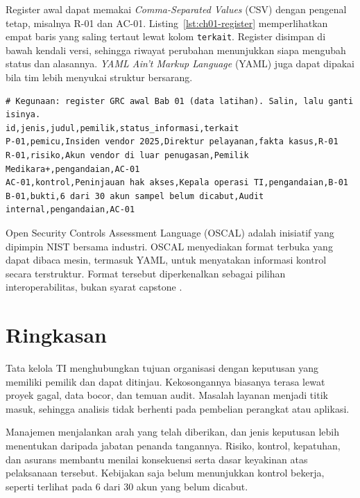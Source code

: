 \begin{pendalaman}
Register awal dapat memakai \textit{Comma-Separated Values} (CSV) dengan pengenal tetap,
misalnya R-01 dan AC-01. Listing~\ref{lst:ch01-register} memperlihatkan empat baris yang
saling tertaut lewat kolom \texttt{terkait}. Register disimpan di bawah kendali versi, sehingga
riwayat perubahan menunjukkan siapa mengubah status dan alasannya. \textit{YAML Ain't Markup
Language} (YAML) juga dapat dipakai bila tim lebih menyukai struktur bersarang.

\begin{lstlisting}[basicstyle=\ttfamily\scriptsize,columns=fullflexible,frame=lines,breaklines=true,
  caption={Register GRC awal (data latihan), tersedia di \berkas{sources/chapter01/register-grc-awal.csv}},
  label={lst:ch01-register}]
# Kegunaan: register GRC awal Bab 01 (data latihan). Salin, lalu ganti isinya.
id,jenis,judul,pemilik,status_informasi,terkait
P-01,pemicu,Insiden vendor 2025,Direktur pelayanan,fakta kasus,R-01
R-01,risiko,Akun vendor di luar penugasan,Pemilik Medikara+,pengandaian,AC-01
AC-01,kontrol,Peninjauan hak akses,Kepala operasi TI,pengandaian,B-01
B-01,bukti,6 dari 30 akun sampel belum dicabut,Audit internal,pengandaian,AC-01
\end{lstlisting}

Open Security Controls Assessment Language (OSCAL) adalah inisiatif yang dipimpin NIST bersama
industri. OSCAL menyediakan format terbuka
yang dapat dibaca mesin, termasuk YAML, untuk menyatakan informasi kontrol secara terstruktur.
Format tersebut diperkenalkan sebagai pilihan interoperabilitas, bukan syarat capstone
\cite{c14-oscal}.
\end{pendalaman}

\section{Ringkasan}

Tata kelola TI menghubungkan tujuan organisasi dengan keputusan yang memiliki pemilik dan
dapat ditinjau. Kekosongannya biasanya terasa lewat proyek gagal, data bocor, dan temuan
audit. Masalah layanan menjadi titik masuk, sehingga analisis tidak berhenti pada pembelian
perangkat atau aplikasi.

Manajemen menjalankan arah yang telah diberikan, dan jenis keputusan lebih menentukan daripada
jabatan penanda tangannya. Risiko, kontrol, kepatuhan, dan asurans membantu menilai konsekuensi
serta dasar keyakinan atas pelaksanaan tersebut. Kebijakan saja belum menunjukkan kontrol
bekerja, seperti terlihat pada 6 dari 30 akun yang belum dicabut.

